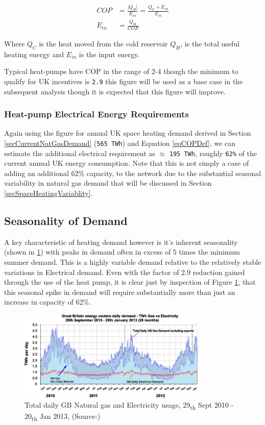 \documentclass[11pt]{article}
\numberwithin{equation}{section}
\begin{document}
\begin{align}
\label{eqCOPDef}
COP &= \frac{|Q_H|}{E_{in}} = \frac{Q_C+E_{in}}{E_{in}}\\
E_{in} &= \frac{Q_H}{COP}
\end{align}

Where \(Q_C\) is the heat moved from the cold reservoir \(Q_H\), is the total useful heating energy and \(E_{in}\) is the input energy.

Typical heat-pumps have COP in the range of 2-4 though the minimum to qualify for UK incentives is \texttt{2.9} this figure will be used as a base case in the subsequent analysis though it is expected that this figure will improve.

\subsubsection{Heat-pump Electrical Energy Requirements}
\label{sec:org0ffe57b}
Again using the figure for annual UK space heating demand derived in Section \ref{secCurrentNatGasDemand} (\texttt{565 TWh}) and Equation \ref{eqCOPDef}, we can estimate the additional electrical requirement as \(\approx\) \texttt{195 TWh}, roughly \texttt{62\%} of the current annual UK energy consumption. Note that this is not simply a case of adding an additional 62\% capacity, to the network due to the substantial seasonal variability in natural gas demand that will be discussed in Section \ref{secSpaceHeatingVariablity}.

\subsection{Seasonality of Demand \label{secSpaceHeatingVariablity}}
\label{sec:org1c4517d}
A key characteristic of heating demand however is it's inherent seasonality (shown in \ref{figHeatingSeasonality}) with peaks in demand often in excess of 5 times the minimum summer demand. This is a highly variable demand relative to the relatively stable variations in Electrical demand. Even with the factor of 2.9 reduction gained through the use of the heat pump, it is clear just by inspection of Figure \ref{figHeatingSeasonality}, that this seasonal spike in demand will require substantially more than just an increase in capacity of 62\%.

\begin{figure}[H]
\centering
\includegraphics[width=0.8\textwidth]{Figures/SeasonalEnergyVariation.jpg}
\caption{\label{figHeatingSeasonality}Total daily GB Natural gas and Electricity usage, 29\textsubscript{th} Sept 2010 - 20\textsubscript{th} Jan 2013, (Source:\cite{ukNatGasAndElecConsumption})}
\end{figure}
\end{document}
